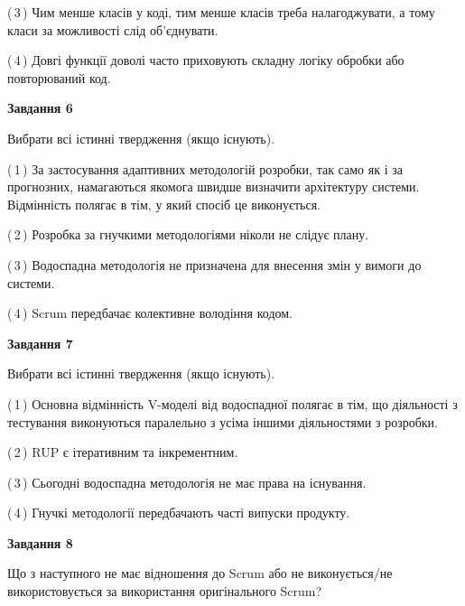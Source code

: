 \documentclass[10pt, ukrainian]{article}
\begin{document}
{\begin {large}
(\,3\,) Чим менше класів у коді, тим менше класів треба налагоджувати, а тому класи за можливості слід об'єднувати. %



(\,4\,) Довгі функції доволі часто приховують складну логіку обробки або повторюваний код. %

\newpage

{\begin {center}\textbf{Завдання 6}\end {center}}\par
Вибрати всі істинні твердження (якщо існують).\par
\vspace{2mm}



(\,1\,) За застосування адаптивних методологій розробки, так само як і за прогнозних, намагаються якомога швидше визначити архітектуру системи. Відмінність полягає в тім, у який спосіб це виконується.%



(\,2\,) Розробка за гнучкими методологіями ніколи не слідує плану. %



(\,3\,) Водоспадна методологія не призначена для внесення змін у вимоги до системи. %



(\,4\,) Scrum передбачає колективне володіння кодом. %


{\begin {center}\textbf{Завдання 7}\end {center}}\par
Вибрати всі істинні твердження (якщо існують).\par
\vspace{2mm}



(\,1\,) Основна відмінність V-моделі від водоспадної полягає в тім, що діяльності з тестування виконуються паралельно з усіма іншими діяльностями з розробки. %



(\,2\,) RUP є ітеративним та інкрементним.%



(\,3\,) Сьогодні водоспадна методологія не має права на існування. %



(\,4\,) Гнучкі методології передбачають часті випуски продукту. %


{\begin {center}\textbf{Завдання 8}\end {center}}\par
Що з наступного не має відношення до Scrum або не виконується/не використовується за використання оригінального Scrum?\par
\vspace{2mm}




\end{large}}
\end{document}
